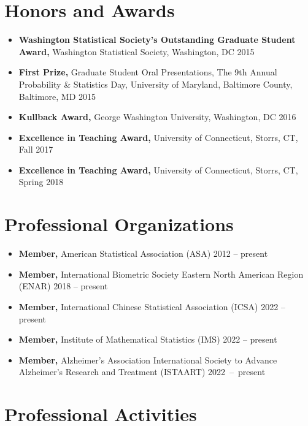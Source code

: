 \documentclass[12pt]{article}
\begin{document}
	\section*{Honors and Awards}
	\begin{itemize}
		\item {\bf Washington Statistical Society's Outstanding Graduate Student Award,} Washington Statistical Society, Washington, DC \hfill 2015
		\item {\bf First Prize,} Graduate Student Oral Presentations, The 9th Annual Probability \& Statistics Day,  University of Maryland, Baltimore County, Baltimore, MD \hfill 2015
		\item {\bf Kullback Award,} George Washington University, Washington, DC \hfill 2016
		\item {\bf Excellence in Teaching Award,} University of Connecticut, Storrs, CT, \hfill Fall 2017
		\item {\bf Excellence in Teaching Award,} University of Connecticut, Storrs, CT, \hfill Spring 2018
	\end{itemize}
		
	\section*{Professional Organizations}
	\begin{itemize}
		\item {\bf Member,} American Statistical Association (ASA) \hfill 2012 -- present
		\item {\bf Member,} International Biometric Society Eastern North American Region (ENAR) \hfill 2018 -- present
		\item {\bf Member,} International Chinese Statistical Association (ICSA) \hfill 2022 -- present
		\item {\bf Member,} Institute of Mathematical Statistics (IMS) \hfill 2022 -- present
		\item {\bf Member,} Alzheimer's Association International Society to Advance Alzheimer's Research and Treatment (ISTAART) \hfill \mbox{2022 -- present}
	\end{itemize}

	\section*{Professional Activities}
	
	
\end{document}
